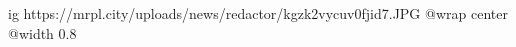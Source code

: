  
 
 
 
 

\ifcmt
  ig https://mrpl.city/uploads/news/redactor/kgzk2vycuv0fjid7.JPG
  @wrap center
  @width 0.8
\fi

